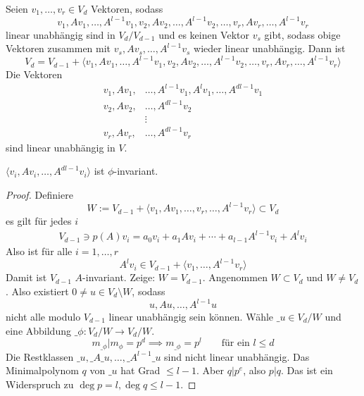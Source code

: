 \documentclass{mycourse}
\begin{document}
\begin{lem}
	\label{lem:12.14}
	Seien $v_1,\dotsc, v_r \in V_d$ Vektoren, sodass
	\[
		v_1,Av_1, \dotsc, A^{l-1}v_1, v_2, Av_2, \dotsc, A^{l-1}v_2, \dotsc, v_r,Av_r, \dotsc, A^{l-1}v_r
	\]
	linear unabhängig sind in $V_d/V_{d-1}$ und es keinen Vektor $v_s$ gibt, sodass obige Vektoren zusammen mit $v_s,Av_s,\dotsc, A^{l-1}v_s$ wieder linear unabhängig.
	Dann ist
	\[
		V_d =  V_{d-1} + \langle v_1,Av_1, \dotsc, A^{l-1}v_1, v_2, Av_2, \dotsc, A^{l-1}v_2, \dotsc, v_r,Av_r, \dotsc, A^{l-1}v_r\rangle
	\]
	Die Vektoren
	\begin{align*}
		v_1, Av_1, &\dotsc, A^{l-1}v_1, A^lv_1, \dotsc, A^{dl-1}v_1\\
		v_2, Av_2, &\dotsc, A^{dl-1}v_2\\
		&\vdots\\
		v_r, Av_r, &\dotsc, A^{dl-1}v_r
	\end{align*}
	sind linear unabhängig in $V$.
	\begin{note}
		$\langle v_i, Av_i, \dotsc, A^{dl-1}v_i\rangle$ ist $\phi$-invariant.
	\end{note}
	\begin{proof}
		Definiere
		\[
			W:= V_{d-1} + \langle v_1, Av_1, \dotsc, v_r, \dotsc, A^{l-1}v_r\rangle \subset V_d
		\]
		es gilt für jedes $i$
		\begin{align*}
			V_{d-1} \ni p(A)v_i = a_0v_i + a_1Av_i + \dotsb + a_{l-1}A^{l-1}v_i + A^lv_i
		\end{align*}
		Also ist für alle $i=1,\dotsc,r$
		\[
			A^lv_i \in V_{d-1} + \langle v_1,\dotsc, A^{l-1}v_r\rangle
		\]
		Damit ist $V_{d-1}$ $A$-invariant.
		Zeige: $W = V_{d-1}$.
		Angenommen $W\subset V_d$ und $W\neq V_d$.
		Also existiert $0\neq u\in V_d \setminus W$, sodass
		\[
			u, Au, \dotsc, A^{l-1}u
		\]
		nicht alle modulo $V_{d-1}$ linear unabhängig sein können.
		Wähle $\_u\in V_d/W$ und eine Abbildung $\_\phi: V_d/W \to V_d/W$.
		\[
			m_{\_\phi}| m_{\phi} = p^d \implies m_{\_\phi} = p^l \qquad \text{für ein $l\le d$}
		\]
		Die Restklassen $\_u, \_A\_u, \dotsc, \_A^{l-1}\_u$ sind nicht linear unabhängig.
		Das Minimalpolynom $q$ von $\_u$ hat Grad $\le l-1$.
		Aber $q|p^e$, also $p|q$.
		Das ist ein Widerspruch zu $\deg p=l, \deg q \le l-1$.


\end{proof}
\end{lem}
\end{document}
